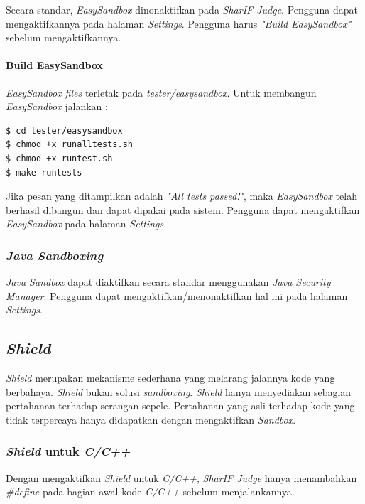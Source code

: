 \documentclass[a4paper,twoside]{article}
\begin{document}
\begin{enumerate}
		Secara standar, \textit{EasySandbox} dinonaktifkan pada \textit{SharIF Judge}. Pengguna dapat mengaktifkannya pada halaman \textit{Settings}. Pengguna harus \textit{"Build EasySandbox"} sebelum mengaktifkannya.
		
		\paragraph{Build EasySandbox}
		\textit{EasySandbox files} terletak pada \textit{tester/easysandbox}. Untuk membangun \textit{EasySandbox} jalankan :
		
		\begin{lstlisting}[basicstyle=\ttfamily, frame=single,
		columns=fullflexible, keepspaces=true, breaklines=true, label=ls:18]
$ cd tester/easysandbox
$ chmod +x runalltests.sh
$ chmod +x runtest.sh
$ make runtests
		\end{lstlisting}
		
		Jika pesan yang ditampilkan adalah \textit{"All tests passed!"}, maka \textit{EasySandbox} telah berhasil dibangun dan dapat dipakai pada sistem. Pengguna dapat mengaktifkan \textit{EasySandbox} pada halaman \textit{Settings}.
		
		\subsubsection*{\textit{Java Sandboxing}}
		\label{subsubsec:java_sandbox}
		\textit{Java Sandbox} dapat diaktifkan secara standar menggunakan \textit{Java Security Manager}. Pengguna dapat mengaktifkan/menonaktifkan hal ini pada halaman \textit{Settings}.
		
		\subsection*{\textit{Shield}}
		\label{subsubsec:shield}
		\textit{Shield} merupakan mekanisme sederhana yang melarang jalannya kode yang berbahaya. \textit{Shield} bukan solusi \textit{sandboxing}. \textit{Shield} hanya menyediakan sebagian pertahanan terhadap serangan sepele. Pertahanan yang asli terhadap kode yang tidak terpercaya hanya didapatkan dengan mengaktifkan \textit{Sandbox}.
		
		\subsubsection*{\textit{Shield} untuk \textit{C/C++}}
		\label{subsubsec:shield_c/c++}
		Dengan mengaktifkan \textit{Shield} untuk \textit{C/C++}, \textit{SharIF Judge} hanya menambahkan \textit{\#define} pada bagian awal kode \textit{C/C++} sebelum menjalankannya.
		

\end{enumerate}
\end{document}
